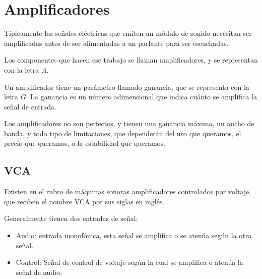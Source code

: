 \documentclass[../principal.tex]{subfiles}
\begin{document}
\chapter{Amplificadores}

Típicamente las señales eléctricas que emiten un módulo de sonido necesitan ser amplificadas antes de ser alimentadas a un parlante para ser escuchadas.

Los componentes que hacen ese trabajo se llaman amplificadores, y se representan con la letra $A$.

Un amplificador tiene un parámetro llamado ganancia, que se representa con la letra $G$. La ganancia es un número adimensional que indica cuánto se amplifica la señal de entrada.

Los amplificadores no son perfectos, y tienen una ganancia máxima, un ancho de banda, y todo tipo de limitaciones, que dependerán del uso que queramos, el precio que queramos, o la estabilidad que queramos.

\section{VCA}

Existen en el rubro de máquinas sonoras amplificadores controlados por voltaje, que reciben el nombre VCA por sus siglas en inglés.

Generalmente tienen dos entradas de señal:

\begin{itemize}
    \item Audio: entrada monofónica, esta señal se amplifica o se atenúa según la otra señal.
    \item Control: Señal de control de voltaje según la cual se amplifica o atenúa la señal de audio.
\end{itemize}

\newpage
\end{document}
